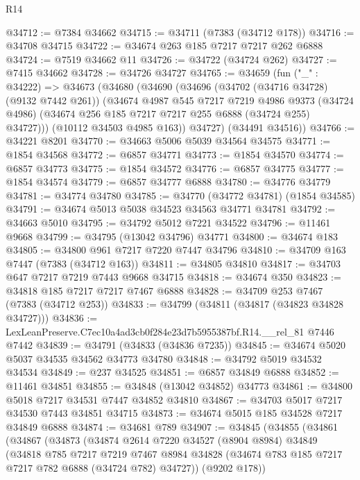 \begin{lexlean}{R14}
\begin{coremodule}
@34712 := @7384 @34662
@34715 := @34711 (@7383 (@34712 @178))
@34716 := @34708 @34715
@34722 := @34674 @263 @185 @7217 @7217 @262 @6888
@34724 := @7519 @34662 @11
@34726 := @34722 (@34724 @262)
@34727 := @7415 @34662
@34728 := @34726 @34727
@34765 := @34659
    (fun ("_" : @34222) =>
    @34673
      (@34680
        (@34690
          (@34696
            (@34702 (@34716 @34728) (@9132 @7442 @261))
            (@34674
              @4987
              @545
              @7217
              @7219
              @4986
              @9373
              (@34724 @4986)
              (@34674 @256 @185 @7217 @7217 @255 @6888 (@34724 @255) @34727)))
          (@10112 @34503 @4985 @163))
        @34727)
      (@34491 @34516))
@34766 := @34221 @8201
@34770 := @34663 @5006 @5039 @34564 @34575
@34771 := @1854 @34568
@34772 := @6857 @34771
@34773 := @1854 @34570
@34774 := @6857 @34773
@34775 := @1854 @34572
@34776 := @6857 @34775
@34777 := @1854 @34574
@34779 := @6857 @34777 @6888
@34780 := @34776 @34779
@34781 := @34774 @34780
@34785 := @34770 (@34772 @34781) (@1854 @34585)
@34791 := @34674 @5013 @5038 @34523 @34563 @34771 @34781
@34792 := @34663 @5010
@34795 := @34792 @5012 @7221 @34522
@34796 := @11461 @9668
@34799 := @34795 (@13042 @34796) @34771
@34800 := @34674 @183
@34805 := @34800 @961 @7217 @7220 @7447 @34796
@34810 := @34709 @163 @7447 (@7383 (@34712 @163))
@34811 := @34805 @34810
@34817 := @34703 @647 @7217 @7219 @7443 @9668 @34715
@34818 := @34674 @350
@34823 := @34818 @185 @7217 @7217 @7467 @6888
@34828 := @34709 @253 @7467 (@7383 (@34712 @253))
@34833 := @34799 (@34811 (@34817 (@34823 @34828 @34727)))
@34836 := LexLeanPreserve.C7ec10a4ad3cb0f284e23d7b5955387bf.R14.__rel_81 @7446 @7442
@34839 := @34791 (@34833 (@34836 @7235))
@34845 := @34674 @5020 @5037 @34535 @34562 @34773 @34780
@34848 := @34792 @5019 @34532 @34534
@34849 := @237 @34525
@34851 := @6857 @34849 @6888
@34852 := @11461 @34851
@34855 := @34848 (@13042 @34852) @34773
@34861 := @34800 @5018 @7217 @34531 @7447 @34852 @34810
@34867 := @34703 @5017 @7217 @34530 @7443 @34851 @34715
@34873 := @34674 @5015 @185 @34528 @7217 @34849 @6888
@34874 := @34681 @789
@34907 := @34845
    (@34855
      (@34861
        (@34867
          (@34873
            (@34874
              @2614
              @7220
              @34527
              (@8904 @8984)
              @34849
              (@34818
                @785
                @7217
                @7219
                @7467
                @8984
                @34828
                (@34674 @783 @185 @7217 @7217 @782 @6888 (@34724 @782) @34727))
              (@9202 @178))

\end{coremodule}
\end{lexlean}
